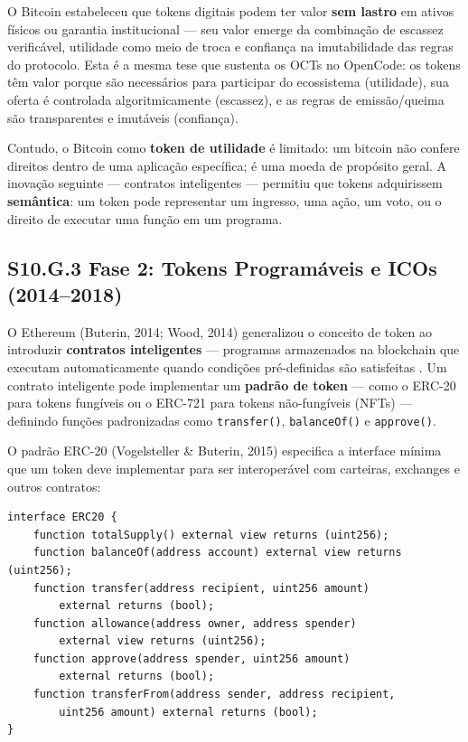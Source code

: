 O Bitcoin estabeleceu que tokens digitais podem ter valor \textbf{sem lastro} em ativos físicos ou garantia institucional --- seu valor emerge da combinação de escassez verificável, utilidade como meio de troca e confiança na imutabilidade das regras do protocolo. Esta é a mesma tese que sustenta os OCTs no OpenCode: os tokens têm valor porque são necessários para participar do ecossistema (utilidade), sua oferta é controlada algoritmicamente (escassez), e as regras de emissão/queima são transparentes e imutáveis (confiança).

Contudo, o Bitcoin como \textbf{token de utilidade} é limitado: um bitcoin não confere direitos dentro de uma aplicação específica; é uma moeda de propósito geral. A inovação seguinte --- contratos inteligentes --- permitiu que tokens adquirissem \textbf{semântica}: um token pode representar um ingresso, uma ação, um voto, ou o direito de executar uma função em um programa.

\subsection*{S10.G.3 Fase 2: Tokens Programáveis e ICOs (2014--2018)}

O Ethereum (Buterin, 2014; Wood, 2014) generalizou o conceito de token ao introduzir \textbf{contratos inteligentes} --- programas armazenados na blockchain que executam automaticamente quando condições pré-definidas são satisfeitas \cite{buterin2014ethereum, wood2014ethereum}. Um contrato inteligente pode implementar um \textbf{padrão de token} --- como o ERC-20 para tokens fungíveis ou o ERC-721 para tokens não-fungíveis (NFTs) --- definindo funções padronizadas como \texttt{transfer()}, \texttt{balanceOf()} e \texttt{approve()}.

O padrão ERC-20 (Vogelsteller \& Buterin, 2015) especifica a interface mínima que um token deve implementar para ser interoperável com carteiras, exchanges e outros contratos:

\begin{verbatim}
interface ERC20 {
    function totalSupply() external view returns (uint256);
    function balanceOf(address account) external view returns (uint256);
    function transfer(address recipient, uint256 amount)
        external returns (bool);
    function allowance(address owner, address spender)
        external view returns (uint256);
    function approve(address spender, uint256 amount)
        external returns (bool);
    function transferFrom(address sender, address recipient,
        uint256 amount) external returns (bool);
}
\end{verbatim}

